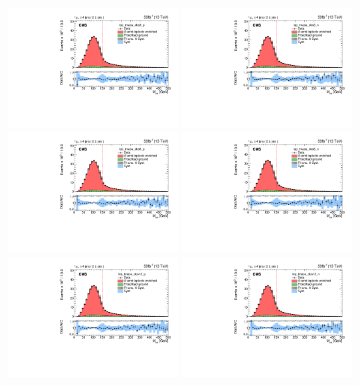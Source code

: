 \begin{figure}
    \centering
    \includegraphics[width=0.4\textwidth]{figure/FitResult_18_mu_lep_tmass_obs3_p_chi2_20.pdf}
    \includegraphics[width=0.4\textwidth]{figure/FitResult_18_mu_lep_tmass_obs3_n_chi2_20.pdf}
    \includegraphics[width=0.4\textwidth]{figure/FitResult_18_mu_lep_tmass_obs6_p_chi2_20.pdf}
    \includegraphics[width=0.4\textwidth]{figure/FitResult_18_mu_lep_tmass_obs6_n_chi2_20.pdf}
    \includegraphics[width=0.4\textwidth]{figure/FitResult_18_mu_lep_tmass_obs12_p_chi2_20.pdf}
    \includegraphics[width=0.4\textwidth]{figure/FitResult_18_mu_lep_tmass_obs12_n_chi2_20.pdf}

\end{figure}
